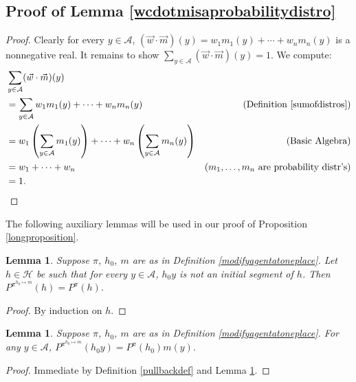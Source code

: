 \documentclass[twoside]{article}
\newtheorem{lemma}[theorem]{Lemma}
\begin{document}
\subsection{Proof of Lemma \ref{wcdotmisaprobabilitydistro}}
\begin{proof}
    Clearly for every $y\in\mathcal A$,
    $(\vec w\cdot\vec m)(y) = w_1m_1(y) + \cdots + w_nm_n(y)$ is a nonnegative
    real. It remains to show $\sum_{y\in\mathcal A}(\vec w\cdot\vec m)(y)=1$.
    We compute:
    \begin{align*}
        &{} \sum_{y\in\mathcal A}(\vec w\cdot\vec m)(y)\\
        &=
        \sum_{y\in\mathcal A} w_1m_1(y) + \cdots + w_nm_n(y)
            &\mbox{(Definition \ref{sumofdistros})}\\
        &=
        w_1\left(\sum_{y\in\mathcal A} m_1(y)\right)
        + \cdots + w_n\left(\sum_{y\in\mathcal A}m_n(y)\right)
            &\mbox{(Basic Algebra)}\\
        &= w_1 + \cdots + w_n
            &\mbox{($m_1,\ldots,m_n$ are probability distr's)}\\
        &= 1.
    \end{align*}
\end{proof}

The following auxiliary lemmas will be used in our proof of
Proposition \ref{longproposition}.

\begin{lemma}
\label{firsttechlemmaforgenericity}
    Suppose $\pi$, $h_0$, $m$ are as in Definition \ref{modifyagentatoneplace}.
    Let $h\in\mathcal H$ be such that
    for every $y\in\mathcal A$,
    $h_0y$ is not an initial segment of $h$.
    Then $P^{\pi^{h_0\mapsto m}}(h)=P^\pi(h)$.
\end{lemma}

\begin{proof}
    By induction on $h$.
\end{proof}

\begin{lemma}
\label{thirdtechlemmaforgenericity}
    Suppose $\pi$, $h_0$, $m$ are as in Definition \ref{modifyagentatoneplace}.
    For any $y\in\mathcal A$,
    $P^{\pi^{h_0\mapsto m}}(h_0y)=P^\pi(h_0)m(y)$.
\end{lemma}

\begin{proof}
    Immediate by Definition \ref{pullbackdef} and Lemma \ref{firsttechlemmaforgenericity}.
\end{proof}
\end{document}
